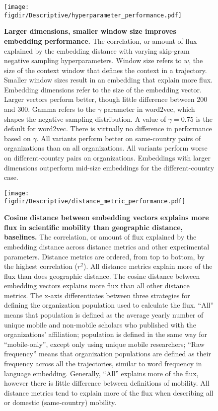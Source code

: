 \documentclass[12pt]{article} %
\def\figdir{../Figs}
\begin{document}
%
%
\begin{figure}[p!]
	\centering
	\texttt{[image: \\figdir/Descriptive/hyperparameter\_performance.pdf]}
	\caption{
		\textbf{Larger dimensions, smaller window size improves embedding performance.}
		The correlation, or amount of flux explained by the embedding distance with varying skip-gram negative sampling hyperparameters.
		Window size refers to $w$, the size of the context window that defines the context in a trajectory.
		Smaller window sizes result in an embedding that explain more flux.
		Embedding dimensions refer to the size of the embedding vector.
		Larger vectors perform better, though little difference between 200 and 300.
		Gamma refers to the $\gamma$ parameter in word2vec, which shapes the negative sampling distribution. 
		A value of $\gamma = 0.75$ is the default for word2vec.
		There is virtually no difference in performance based on $\gamma$.
		All variants perform better on same-country pairs of organizations than on all organizations.
		All variants perform worse on different-country pairs on organizations.
		Embeddings with larger dimensions outperform mid-size embeddings for the different-country case.
	}
	\label{fig:supp:hyperparameter}
\end{figure}



%
%
\begin{figure}[p!]
	\centering
	\texttt{[image: \\figdir/Descriptive/distance\_metric\_performance.pdf]}
	\caption{
		\textbf{Cosine distance between embedding vectors explains more flux in scientific mobility than geographic distance, baselines.}
		The correlation, or amount of flux explained by the embedding distance across distance metrics and other experimental parameters. 
		Distance metrics are ordered, from top to bottom, by the highest correlation ($r^{2}$). 
		All distance metrics explain more of the flux than does geographic distance.
		The cosine distance between embedding vectors explains more flux than all other distance metrics. 
		The x-axis differentiates between three strategies for defining the organization population used to calculate the flux. 
		``All'' means that population is defined as the average yearly number of unique mobile and non-mobile scholars who published with the organizations' affiliation;
		population is defined in the same way for ``mobile-only'', except only using unique mobile researchers;
		``Raw frequency'' means that organization populations are defined as their frequency across all the trajectories, similar to word frequency in language embedding. 
		Generally, ``All'' explains more of the flux, however there is little difference between definitions of mobility.
		All distance metrics tend to explain more of the flux when describing all or domestic (same-country) mobility.	
		}
	\label{fig:supp:distancemetrics}
\end{figure}
\end{document}
